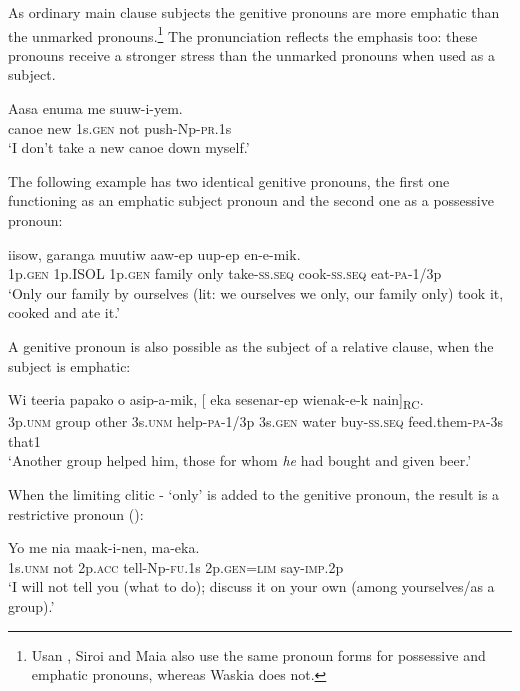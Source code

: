 As ordinary main clause subjects the genitive pronouns are more emphatic than the unmarked pronouns.\footnote{Usan \citep[55]{Reesink1984}, Siroi \citep[20]{Wells1979} and Maia \citep[73]{Hardin2002} also use the same pronoun forms for possessive and emphatic pronouns, whereas Waskia \citep{RossEtAl1978} does not.} The pronunciation reflects the emphasis too: these pronouns receive a stronger stress than the unmarked pronouns when used as a subject.

\ea%
\label{ex:x572}
\gll Aasa enuma  me suuw-i-yem. \\
canoe new 1s.\textsc{gen} not push-Np-\textsc{pr}.1s\\
\glt`I don't take a new canoe down myself.'
\z

The following example has two identical genitive pronouns, the first one functioning as an emphatic subject pronoun and the second one as a possessive pronoun:

\ea%
\label{ex:x686}
\gll {} iisow,  garanga muutiw aaw-ep uup-ep en-e-mik.\\
1p.\textsc{gen} 1p.ISOL 1p.\textsc{gen} family only take-\textsc{ss}.\textsc{seq} cook-\textsc{ss}.\textsc{seq} eat-\textsc{pa}-1/3p\\
\glt`Only our family by ourselves (lit: we ourselves we only, our family only) took it, cooked and ate it.'
\z

A genitive pronoun is also possible as the subject of a relative clause, when the subject is emphatic:

\ea%
\label{ex:x1809}
\gll Wi teeria papako o asip-a-mik, [ eka sesenar-ep wienak-e-k nain]\textsubscript{RC}.
\\
3p.\textsc{unm} group other 3s.\textsc{unm} help-\textsc{pa}-1/3p 3s.\textsc{gen} water buy-\textsc{ss}.\textsc{seq} feed.them-\textsc{pa}-3s that1\\
\glt`Another group helped him, those for whom \textit{he} had bought and given beer.'
\z

When the limiting clitic - `only' is added to the genitive pronoun, the result is a restrictive pronoun ():

\ea%
\label{ex:x604}
\gll Yo me nia maak-i-nen,  ma-eka. \\
1s.\textsc{unm} not 2p.\textsc{acc} tell-Np-\textsc{fu}.1s 2p.\textsc{gen}=\textsc{lim} say-\textsc{imp}.2p\\
\glt`I will not tell you (what to do); discuss it on your own (among yourselves/as a group).'
\z


